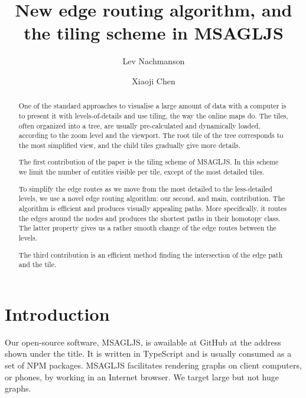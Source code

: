 \documentclass{llncs}
\begin{document}
\title{New edge routing algorithm, and the tiling scheme in MSAGLJS}
\author{%
  Lev Nachmanson \and
  Xiaoji Chen
}%
\maketitle

\begin{abstract}
  One of the standard approaches to visualise a large amount of data with a computer is to present it with levels-of-details and use tiling, the way the online maps do. The tiles, often organized into a tree, are usually pre-calculated and dynamically loaded, according to the zoom level and the viewport. The root tile of the tree corresponds to the most simplified view, and the child tiles gradually give more details.
  
  The first contribution of the paper is the tiling scheme of MSAGLJS. In this scheme we limit the number of entities visible per tile, except of the most detailed tiles. 
  
  To simplify the edge routes as we move from the most detailed to the less-detailed levels, we use a novel edge routing algorithm: our second, and main, contribution. The algorithm is efficient and produces visually appealing paths. More specifically, it routes the edges around the nodes and produces the shortest paths in their homotopy class. The latter property gives us a rather smooth change of the edge routes between the levels.

  The third contribution is an efficient method finding the intersection of the edge path and the tile.
\end{abstract}


\section{Introduction}

\label{sec:intro}
Our open-source software, MSAGLJS, is awailable at GitHub at the address shown under the title. It is written in TypeScript and is usually consumed as a set of NPM packages. MSAGLJS facilitates rendering graphs on client computers, or phones, by working in an Internet browser.
We target large but not huge graphs.
\end{document}
